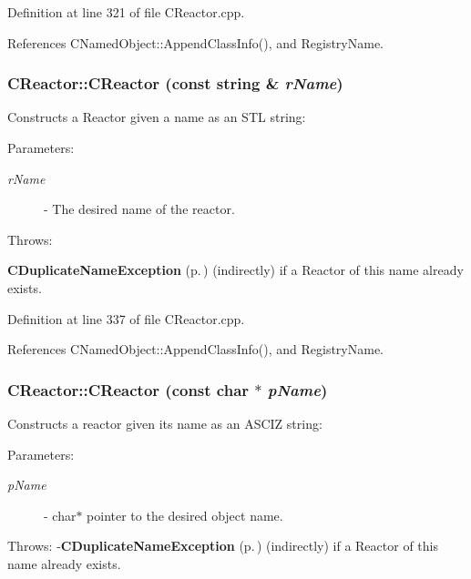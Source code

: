 Definition at line 321 of file CReactor.cpp.

References CNamed\-Object::Append\-Class\-Info(), and Registry\-Name.
\subsubsection{\setlength{\rightskip}{0pt plus 5cm}CReactor::CReactor (const string \& {\em r\-Name})}\label{classCReactor_a1}


Constructs a Reactor given a name as an STL string:\begin{Desc}
\item[Parameters: ]\par
\begin{description}
\item[{\em 
r\-Name}]- The desired name of the reactor.\end{description}
\end{Desc}
Throws:\begin{CompactItemize}
\item 
{\bf CDuplicate\-Name\-Exception} {\rm (p.\,\pageref{classCDuplicateNameException})} (indirectly) if a Reactor of this name already exists. \end{CompactItemize}


Definition at line 337 of file CReactor.cpp.

References CNamed\-Object::Append\-Class\-Info(), and Registry\-Name.
\subsubsection{\setlength{\rightskip}{0pt plus 5cm}CReactor::CReactor (const char $\ast$ {\em p\-Name})}\label{classCReactor_a2}


Constructs a reactor given its name as an ASCIZ string:\begin{Desc}
\item[Parameters: ]\par
\begin{description}
\item[{\em 
p\-Name}]- char$\ast$ pointer to the desired object name.\end{description}
\end{Desc}
Throws: -{\bf CDuplicate\-Name\-Exception} {\rm (p.\,\pageref{classCDuplicateNameException})} (indirectly) if a Reactor of this name already exists. 

